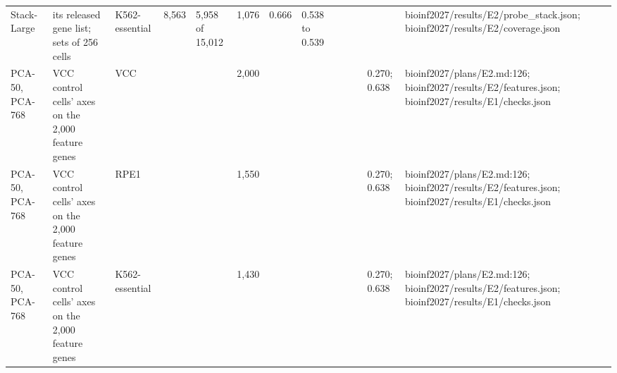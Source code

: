 \begin{tabular}{lllllllllllll}
Stack-Large & its released gene list; sets of 256 cells & K562-essential & 8,563 & 5,958 of 15,012 & 1,076 & 0.666 & 0.538 to 0.539 &  &  &  &  & bioinf2027/results/E2/probe\_stack.json; bioinf2027/results/E2/coverage.json \\
PCA-50, PCA-768 & VCC control cells' axes on the 2,000 feature genes & VCC &  &  & 2,000 &  &  &  &  &  & 0.270; 0.638 & bioinf2027/plans/E2.md:126; bioinf2027/results/E2/features.json; bioinf2027/results/E1/checks.json \\
PCA-50, PCA-768 & VCC control cells' axes on the 2,000 feature genes & RPE1 &  &  & 1,550 &  &  &  &  &  & 0.270; 0.638 & bioinf2027/plans/E2.md:126; bioinf2027/results/E2/features.json; bioinf2027/results/E1/checks.json \\
PCA-50, PCA-768 & VCC control cells' axes on the 2,000 feature genes & K562-essential &  &  & 1,430 &  &  &  &  &  & 0.270; 0.638 & bioinf2027/plans/E2.md:126; bioinf2027/results/E2/features.json; bioinf2027/results/E1/checks.json \\
\bottomrule
\end{tabular}
